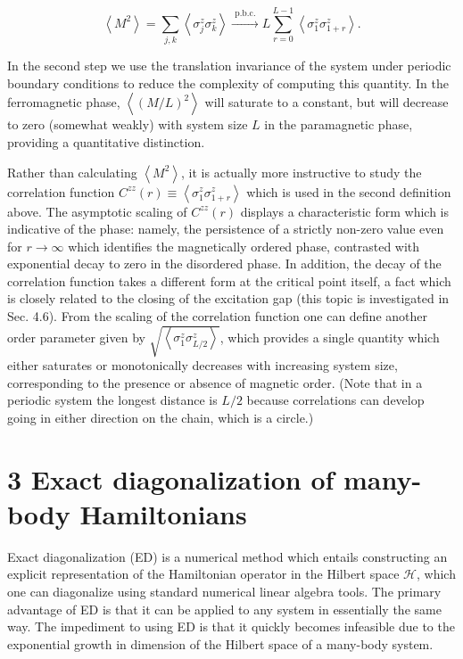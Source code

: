 \documentclass[10pt]{article}
\begin{document}
\begin{equation*}
\left\langle M^{2}\right\rangle=\sum_{j, k}\left\langle\sigma_{j}^{z} \sigma_{k}^{z}\right\rangle \xrightarrow{\text { p.b.c. }} L \sum_{r=0}^{L-1}\left\langle\sigma_{1}^{z} \sigma_{1+r}^{z}\right\rangle . \tag{9}
\end{equation*}


In the second step we use the translation invariance of the system under periodic boundary conditions to reduce the complexity of computing this quantity. In the ferromagnetic phase, $\left\langle(M / L)^{2}\right\rangle$ will saturate to a constant, but will decrease to zero (somewhat weakly) with system size $L$ in the paramagnetic phase, providing a quantitative distinction.

Rather than calculating $\left\langle M^{2}\right\rangle$, it is actually more instructive to study the correlation function $C^{z z}(r) \equiv\left\langle\sigma_{1}^{z} \sigma_{1+r}^{z}\right\rangle$ which is used in the second definition above. The asymptotic scaling of $C^{z z}(r)$ displays a characteristic form which is indicative of the phase: namely, the persistence of a strictly non-zero value even for $r \rightarrow \infty$ which identifies the magnetically ordered phase, contrasted with exponential decay to zero in the disordered phase. In addition, the decay of the correlation function takes a different form at the critical point itself, a fact which is closely related to the closing of the excitation gap (this topic is investigated in Sec. 4.6). From the scaling of the correlation function one can define another order parameter given by $\sqrt{\left\langle\sigma_{1}^{z} \sigma_{L / 2}^{z}\right\rangle}$, which provides a single quantity which either saturates or monotonically decreases with increasing system size, corresponding to the presence or absence of magnetic order. (Note that in a periodic system the longest distance is $L / 2$ because correlations can develop going in either direction on the chain, which is a circle.)

\section*{3 Exact diagonalization of many-body Hamiltonians}
Exact diagonalization (ED) is a numerical method which entails constructing an explicit representation of the Hamiltonian operator in the Hilbert space $\mathcal{H}$, which one can diagonalize using standard numerical linear algebra tools. The primary advantage of ED is that it can be applied to any system in essentially the same way. The impediment to using ED is that it quickly becomes infeasible due to the exponential growth in dimension of the Hilbert space of a many-body system.
\end{document}
